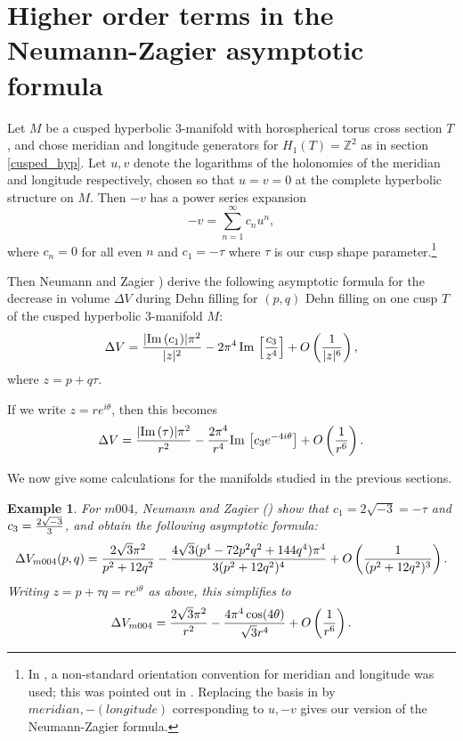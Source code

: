 \documentclass[reqno]{amsproc}  %
\newtheorem{ex}[prop]{\bf Example}
\def\Z{\mathbb{Z}}
\begin{document}
\section{Higher order terms in the Neumann-Zagier asymptotic formula}\label{degree4_NZ} 

Let $M$ be a cusped hyperbolic 3-manifold with horospherical torus cross section $T$,
and chose meridian and longitude generators for $H_1(T)=\Z^2$ as in section \ref{cusped_hyp}.
Let $u,v$ denote the logarithms of the holonomies of the 
meridian and longitude respectively, chosen so that $u=v=0$ at the complete hyperbolic structure on $M$.
 Then $-v$ has a power series expansion
 \begin{equation}  \label{eq21}
 -v = \sum_{n=1}^\infty   c_n u^n ,
\end{equation} 
 where $c_n=0$ for all even $n$ and $c_1 = -\tau$ where $\tau$ is our cusp shape 
 parameter.\footnote{In \cite{NZ},  a non-standard orientation convention for meridian
and longitude was used; this was pointed out in \cite{NR}. 
Replacing the basis in \cite{NZ} by $meridian, -(longitude)$ corresponding to $u,-v$ 
gives our version of the Neumann-Zagier formula.} 

 
Then  Neumann and Zagier \cite[equation (62), p328]{NZ}) derive the following asymptotic formula
for the decrease in volume $\Delta V$ during Dehn filling for $(p,q)$ Dehn filling
on one cusp $T$ of the cusped hyperbolic 3-manifold $M$:
\begin{equation}  \label{eq22}
\Delta V = {|\text{Im}\,(c_1)| \pi^2 \over |z|^2} -
{2 \pi^4}\,\text{Im}\, \left[  {c_3  \over z^4}\right] + O \left({1 \over |z|^6}\right),
\end{equation} 
where  $z =  p + q \tau$.

If we write $z = r e^{i \theta}$, then this becomes
\begin{equation}  \label{eq23}\Delta V = {|\text{Im}\,(\tau)| \pi^2 \over r^2} -
{2 \pi^4 \over r^4 }\text{Im}\, \left[  c_3 e^{-4 i\theta}\right] + O \left({1 \over r^6}\right).
\end{equation} 

We now give some calculations for the manifolds studied in the previous sections.

\begin{ex}\label{m004_NZ4}
{\em 
For $m004$, Neumann and Zagier (\cite[p331]{NZ}) show that
$c_1 = 2 \sqrt{-3}=-\tau$ and $c_3 = {2 \sqrt{-3} \over 3}$,
and obtain the following asymptotic formula:
\begin{equation}  \label{eq24}\Delta V_{m004}(p,q) = {2 \sqrt{3} \pi^2 \over p^2+12q^2}
-{4\sqrt{3}(p^4-72p^2q^2+144q^4)\pi^4 \over 3(p^2 + 12 q^2)^4} + O \left({1 \over (p^2 + 12 q^2)^3}\right).
\end{equation} 
Writing $z = p + \tau q = r e^{i \theta}$ as above, this simplifies to
\begin{equation}  \label{eq25}
\Delta V_{m004} = {2 \sqrt{3} \pi^2 \over r^2} -
{4 \pi^4 \cos(4\theta) \over \sqrt{3} r^4 }+ O \left({1 \over r^6}\right).
\end{equation} 
}
\end{ex}
\end{document}
